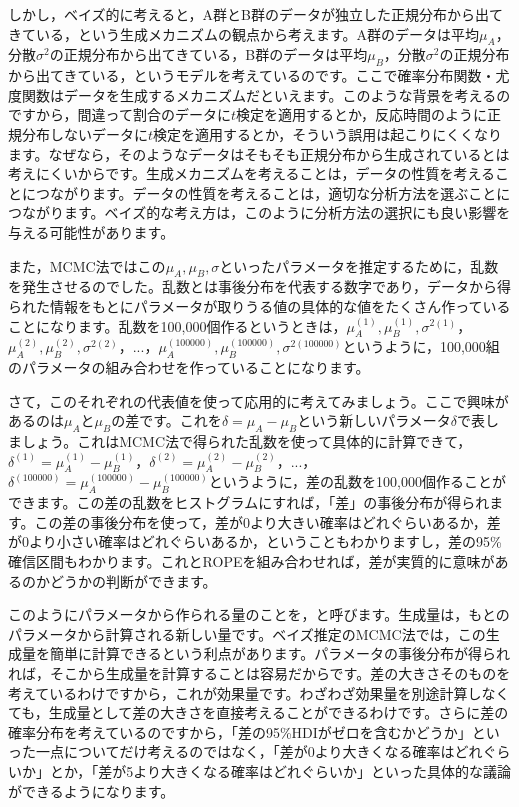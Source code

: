 \documentclass{ltjbook}
\begin{document}
しかし，ベイズ的に考えると，A群とB群のデータが独立した正規分布から出てきている，という生成メカニズムの観点から考えます。A群のデータは平均$\mu_A$，分散$\sigma^2$の正規分布から出てきている，B群のデータは平均$\mu_B$，分散$\sigma^2$の正規分布から出てきている，というモデルを考えているのです。ここで確率分布関数・尤度関数はデータを生成するメカニズムだといえます。このような背景を考えるのですから，間違って割合のデータに$t$検定を適用するとか，反応時間のように正規分布しないデータに$t$検定を適用するとか，そういう誤用は起こりにくくなります。なぜなら，そのようなデータはそもそも正規分布から生成されているとは考えにくいからです。生成メカニズムを考えることは，データの性質を考えることにつながります。データの性質を考えることは，適切な分析方法を選ぶことにつながります。ベイズ的な考え方は，このように分析方法の選択にも良い影響を与える可能性があります。

また，MCMC法ではこの$\mu_A,\mu_B,\sigma$といったパラメータを推定するために，乱数を発生させるのでした。乱数とは事後分布を代表する数字であり，データから得られた情報をもとにパラメータが取りうる値の具体的な値をたくさん作っていることになります。乱数を100,000個作るというときは，$\mu_A^{(1)},\mu_B^{(1)},\sigma^{2(1)}$，$\mu_A^{(2)},\mu_B^{(2)},\sigma^{2(2)}$，...，$\mu_A^{(100000)},\mu_B^{(100000)},\sigma^{2(100000)}$というように，100,000組のパラメータの組み合わせを作っていることになります。

さて，このそれぞれの代表値を使って応用的に考えてみましょう。ここで興味があるのは$\mu_A$と$\mu_B$の差です。これを$\delta = \mu_A - \mu_B$という新しいパラメータ$\delta$で表しましょう。これはMCMC法で得られた乱数を使って具体的に計算できて，$\delta^{(1)} = \mu_A^{(1)} - \mu_B^{(1)}$，$\delta^{(2)} = \mu_A^{(2)} - \mu_B^{(2)}$，...，$\delta^{(100000)} = \mu_A^{(100000)} - \mu_B^{(100000)}$というように，差の乱数を100,000個作ることができます。この差の乱数をヒストグラムにすれば，「差」の事後分布が得られます。この差の事後分布を使って，差が0より大きい確率はどれぐらいあるか，差が0より小さい確率はどれぐらいあるか，ということもわかりますし，差の95\%確信区間もわかります。これとROPEを組み合わせれば，差が実質的に意味があるのかどうかの判断ができます。

このようにパラメータから作られる量のことを，と呼びます。生成量は，もとのパラメータから計算される新しい量です。ベイズ推定のMCMC法では，この生成量を簡単に計算できるという利点があります。パラメータの事後分布が得られれば，そこから生成量を計算することは容易だからです。差の大きさそのものを考えているわけですから，これが効果量です。わざわざ効果量を別途計算しなくても，生成量として差の大きさを直接考えることができるわけです。さらに差の確率分布を考えているのですから，「差の95\%HDIがゼロを含むかどうか」といった一点についてだけ考えるのではなく，「差が0より大きくなる確率はどれぐらいか」とか，「差が5より大きくなる確率はどれぐらいか」といった具体的な議論ができるようになります。
\end{document}
